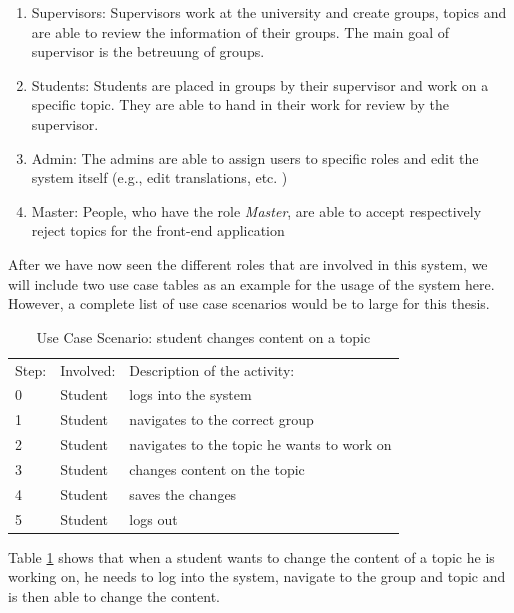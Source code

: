 \begin{enumerate}
	\item Supervisors: Supervisors work at the university and create groups, topics and are able to review the information of their groups. The main goal of supervisor is the betreuung  of groups.
	\item Students: Students are placed in groups by their supervisor and work on a specific topic. They are able to hand in their work for review by the supervisor. 
	\item Admin: The admins are able to assign users to specific roles and edit the system itself (e.g., edit translations, etc. )
	\item Master: People, who have the role \textit{Master}, are able to accept respectively reject topics for the front-end application
\end{enumerate}


After we have now seen the different roles that are involved in this system, we will include two use case tables as an example for the usage of the system here. However, a complete list of use case scenarios would be to large for this thesis.

 \begin{table}[h]
\scriptsize
 \caption{Use Case Scenario: student changes content on a topic}
 \begin{tabular}{lll}
	\toprule
  Step: & Involved: & Description of the activity: \\ 
\cmidrule(rl){1-1}\cmidrule(rl){2-2}\cmidrule(rl){3-3}
  	0 	& Student & logs into the system \\
	1	& Student	& navigates to the correct group \\
	2	& Student & navigates to the topic he wants to work on \\
	3	& Student & changes content on the topic \\
	4	& Student & saves the changes \\	
	5	& Student & logs out \\
	\bottomrule
 \end{tabular}
 \label{tab:ucTopicChange}
 \end{table} 

Table \ref{tab:ucTopicChange} shows that when a student wants to change the content of a topic he is working on, he needs to log into the system, navigate to the group and topic and is then able to change the content.
 
